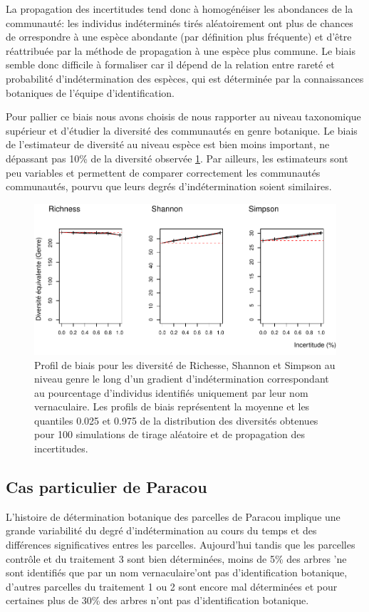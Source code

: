 \documentclass[11pt,french,A4paper,extrafontsizes,onecolumn,openright]{memoir}
\begin{document}
La propagation des incertitudes tend donc à homogénéiser les abondances
de la communauté: les individus indéterminés tirés aléatoirement ont
plus de chances de orrespondre à une espèce abondante (par définition
plus fréquente) et d'être réattribuée par la méthode de propagation à
une espèce plus commune. Le biais semble donc difficile à formaliser car
il dépend de la relation entre rareté et probabilité d'indétermination
des espèces, qui est déterminée par la connaissances botaniques de
l'équipe d'identification.

Pour pallier ce biais nous avons choisis de nous rapporter au niveau
taxonomique supérieur et d'étudier la diversité des communautés en genre
botanique. Le biais de l'estimateur de diversité au niveau espèce est
bien moins important, ne dépassant pas 10\% de la diversité observée
\ref{fig:FigTreesGenus}. Par ailleurs, les estimateurs sont peu
variables et permettent de comparer correctement les communautés
communautés, pourvu que leurs degrés d'indétermination soient
similaires.

\begin{figure}

{\centering \includegraphics[width=0.6\linewidth]{MyBook_files/figure-latex/FigTreesGenus-1} 

}

\caption{Profil de biais pour les diversité de Richesse, Shannon et Simpson au niveau genre le long d'un gradient d'indétermination correspondant au pourcentage d'individus identifiés uniquement par leur nom vernaculaire. Les profils de biais représentent la moyenne et les quantiles 0.025 et 0.975 de la distribution des diversités obtenues pour 100 simulations de tirage aléatoire et de propagation des incertitudes.}\label{fig:FigTreesGenus}
\end{figure}

\subsection{Cas particulier de
Paracou}\label{cas-particulier-de-paracou}

L'histoire de détermination botanique des parcelles de Paracou implique
une grande variabilité du degré d'indétermination au cours du temps et
des différences significatives entres les parcelles. Aujourd'hui tandis
que les parcelles contrôle et du traitement 3 sont bien déterminées,
moins de 5\% des arbres 'ne sont identifiés que par un nom
vernaculaire'ont pas d'identification botanique, d'autres parcelles du
traitement 1 ou 2 sont encore mal déterminées et pour certaines plus de
30\% des arbres n'ont pas d'identification botanique.
\end{document}
